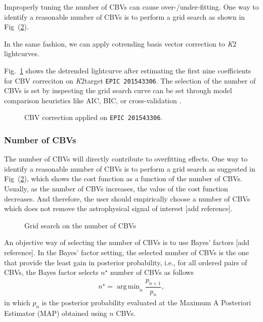 \documentclass[twocolumn]{aastex62}
\newcommand{\ktwo}{{\it K$\mathit{2}$}}
\DeclareMathOperator*{\argmin}{arg\,min}
\begin{document}
Improperly tuning the number of CBVs can cause over-/under-fitting. One
way to identify a reasonable number of CBVs is to perform a grid search
as shown in Fig~(\ref{fig:cbv-grid-search}).

In the same fashion, we can apply cotrending basis vector correction to
\ktwo lightcurves.

Fig.~\ref{fig:cbv-correction-k2} shows the detrended lightcurve after estimating
the first nine coefficients for CBV correciton on \ktwo target
 \texttt{EPIC 201543306}. The selection of the number of CBVs is set by inspecting the
grid search curve can be set through model comparison heuristics like AIC, BIC,
or cross-validation \cite{ivezi2014}.

\begin{figure}
    \centering
    \caption{CBV correction applied on \texttt{EPIC 201543306}.
    \label{fig:cbv-correction-k2}}
\end{figure}

\subsubsection{Number of CBVs}
The number of CBVs will directly contribute to overfitting effects. One
way to identify a reasonable number of CBVs is to perform a grid search
as suggested in Fig~(\ref{fig:cbv-grid-search}), which shows the cost
function as a function of the number of CBVs. Usually, as the number of
CBVs increases, the value of the cost function decreases. And therefore,
the user should empirically choose a number of CBVs which does not
remove the astrophysical signal of interest [add reference].

\begin{figure}[!htb]
    \centering
    \caption{Grid search on the number of CBVs}
    \label{fig:cbv-grid-search}
\end{figure}

An objective way of selecting the number of CBVs is to use Bayes' factors
[add reference]. In the Bayes' factor setting, the selected number of
CBVs is the one that provide the least gain in posterior probability, i.e.,
for all ordered pairs of CBVs, the Bayes factor selects $n^{\star}$ number of CBVs
as follows
\begin{align}
    n^{\star} = \argmin_{n} \dfrac{p_{n+1}}{p_n},
\end{align}
in which $p_n$ is the posterior probability evaluated at the Maximum A Posteriori
Estimator (MAP) obtained using $n$ CBVs.
\end{document}
